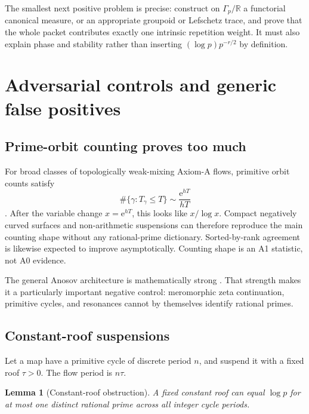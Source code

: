 \documentclass[11pt]{article}
\newtheorem{lemma}[theorem]{Lemma}
\theoremstyle{definition}
\theoremstyle{remark}
\newcommand{\R}{\mathbb{R}}
\newcommand{\e}{\mathrm{e}}
\begin{document}
The smallest next positive problem is precise: construct on
\(\Gamma_p/\R\) a functorial canonical measure, or an appropriate groupoid or
Lefschetz trace, and prove that the whole packet contributes exactly one
intrinsic repetition weight.  It must also explain phase and stability rather
than inserting \((\log p)p^{-r/2}\) by definition.

\section{Adversarial controls and generic false positives}

\subsection{Prime-orbit counting proves too much}

For broad classes of topologically weak-mixing Axiom-A flows, primitive orbit
counts satisfy
\begin{equation}
 \#\{\gamma:T_\gamma\le T\}\sim\frac{\e^{hT}}{hT}
 \label{eq:primeorbit}
\end{equation}
\citep{ParryPollicott1983}.  After the variable change \(x=\e^{hT}\), this
looks like \(x/\log x\).  Compact negatively curved surfaces and non-arithmetic
suspensions can therefore reproduce the main counting shape without any
rational-prime dictionary.  Sorted-by-rank agreement is likewise expected to
improve asymptotically.  Counting shape is an A1 statistic, not A0 evidence.

The general Anosov architecture is mathematically strong
\citep{Anosov1967,Ruelle1976,GLP2013,DyatlovZworski2016}.  That strength makes
it a particularly important negative control: meromorphic zeta continuation,
primitive cycles, and resonances cannot by themselves identify rational
primes.

\subsection{Constant-roof suspensions}

Let a map have a primitive cycle of discrete period \(n\), and suspend it with
a fixed roof \(\tau>0\).  The flow period is \(n\tau\).

\begin{lemma}[Constant-roof obstruction]
A fixed constant roof can equal \(\log p\) for at most one distinct rational
prime across all integer cycle periods.
\end{lemma}
\end{document}
